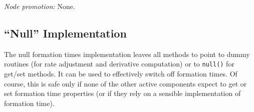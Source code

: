 \noindent\emph{Node promotion:} None.\\

\subsection{``Null'' Implementation}

The null formation times implementation leaves all methods to point to dummy routines (for rate adjustment and derivative computation) or to {\tt null()} for get/set methods. It can be used to effectively switch off formation times. Of course, this is safe only if none of the other active components expect to get or set formation time properties (or if they rely on a sensible implementation of formation time).
